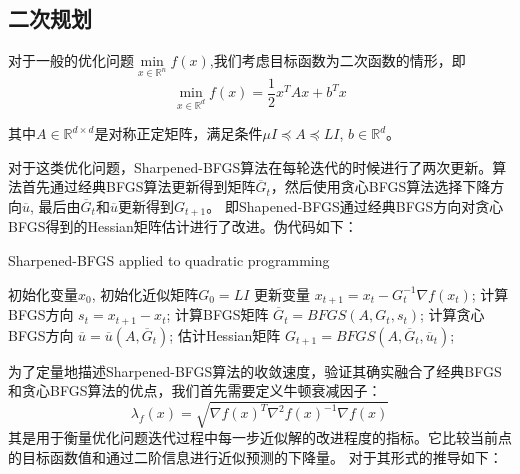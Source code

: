 \documentclass[a4paper,twoside,AutoFakeBold]{article}
\theoremstyle{definition}
\begin{document}
\subsection{二次规划}

对于一般的优化问题$\mathop{\min}\limits_{x\in\mathbb{R}^n}f(x)$,我们考虑目标函数为二次函数的情形，即
\begin{equation}
    \mathop{\min}\limits_{x\in\mathbb{R}^d}f(x)=\frac{1}{2}x^TAx+b^Tx
\end{equation}

其中$A\in\mathbb{R}^{d\times d}$是对称正定矩阵，满足条件$\mu I\preceq A\preceq LI$, $b\in\mathbb{R}^d$。

对于这类优化问题，Sharpened-BFGS算法在每轮迭代的时候进行了两次更新。算法首先通过经典BFGS算法更新得到矩阵$\overline{G}_t$，然后使用贪心BFGS算法选择下降方向$\overline{u}$, 最后由$\overline{G}_t$和$\overline{u}$更新得到$G_{t+1}$。
即Shapened-BFGS通过经典BFGS方向对贪心BFGS得到的Hessian矩阵估计进行了改进。伪代码如下：

\begin{algorithm}[H]\xiaosi
    \caption{\xiaosi Sharpened-BFGS applied to quadratic programming}
    \begin{algorithmic}
        \REQUIRE 初始化变量$x_0$, 初始化近似矩阵$G_0=LI$
            \STATE 更新变量 $x_{t+1}=x_t-G_t^{-1}\nabla f(x_t)$;
            \STATE 计算BFGS方向 $s_t=x_{t+1}-x_t$;
            \STATE 计算BFGS矩阵 $\overline{G}_t=BFGS(A,G_t,s_t)$;
            \STATE 计算贪心BFGS方向 $\overline{u}=\overline{u} (A,\overline{G}_t)$;
            \STATE 估计Hessian矩阵 $G_{t+1}=BFGS(A,\overline{G}_t,\overline{u}_t)$;
        \ENDFOR
    \end{algorithmic}
\end{algorithm}

为了定量地描述Sharpened-BFGS算法的收敛速度，验证其确实融合了经典BFGS和贪心BFGS算法的优点，我们首先需要定义牛顿衰减因子：
\begin{equation}
    \lambda_f (x)=\sqrt{\nabla f(x)^T\nabla ^2 f(x)^{-1}\nabla f(x)}
\end{equation}
其是用于衡量优化问题迭代过程中每一步近似解的改进程度的指标。它比较当前点的目标函数值和通过二阶信息进行近似预测的下降量。
对于其形式的推导如下：
\end{document}
